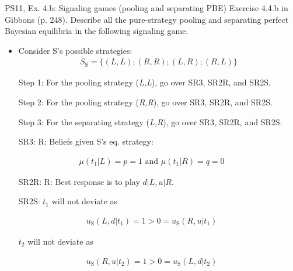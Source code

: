 \begin{frame}{PS11, Ex. 4.b: Signaling games (pooling and separating PBE)}
    Exercise 4.4.b in Gibbons (p. 248). Describe all the pure-strategy pooling and separating perfect Bayesian equilibria in the following signaling game.\vspace{-8pt}
    \begin{multicols}{2}
      \begin{itemize}
        \item Consider S's possible strategies:\vspace{-4pt}\begin{align*}S_\text{S}=\{(L,L);(R,R);(L,R);(R,L)\} \end{align*}\vspace{-16pt}
        \item[Step 1:] For the pooling strategy (\textit{L,L}), go over SR3, SR2R, and SR2S.
        \item[Step 2:] For the pooling strategy (\textit{R,R}), go over SR3, SR2R, and SR2S.
        \item[Step 3:] For the separating strategy (\textit{L,R}), go over SR3, SR2R, and SR2S:
        \item[SR3:] R: Beliefs given S's eq. strategy:
      \end{itemize}\vspace{-10pt}
      \begin{align*}
        \mu(t_1|L)=p=1\text{ and }\mu(t_1|R)=q=0
      \end{align*}\vspace{-18pt}
      \begin{itemize}
        \item[SR2R:] R: Best response is to play $d|L,u|R$.
        \item[SR2S:] $t_1$ will not deviate as
      \end{itemize}\vspace{-10pt}
      \begin{align*}
        u_\text{S}(L,d|t_1)=1>0=u_\text{S}(R,u|t_1)
      \end{align*}\vspace{-20pt}
      \begin{itemize}
        \item[] $t_2$ will not deviate as
      \end{itemize}\vspace{-10pt}
      \begin{align*}
        u_\text{S}(R,u|t_2)=1>0=u_\text{S}(L,d|t_2)
      \end{align*}\vspace{-20pt}

\end{multicols}
\end{frame}
